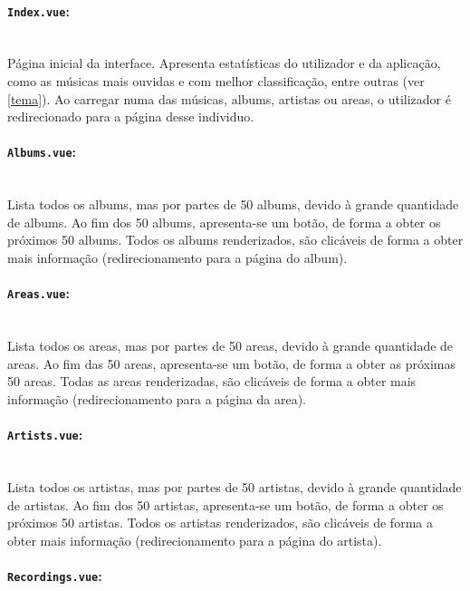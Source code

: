 \documentclass{article}
\begin{document}
\paragraph{\texttt{Index.vue}:}\mbox{}\\

Página inicial da interface. Apresenta estatísticas do utilizador e da aplicação, como as músicas mais ouvidas e com melhor classificação, entre outras (ver \ref{tema}). Ao carregar numa das músicas, albums, artistas ou areas, o utilizador é redirecionado para a página desse individuo.

\paragraph{\texttt{Albums.vue}:}\mbox{}\\

Lista todos os albums, mas por partes de 50 albums, devido à grande quantidade de albums. Ao fim dos 50 albums, apresenta-se um botão, de forma a obter os próximos 50 albums. Todos os albums renderizados, são clicáveis de forma a obter mais informação (redirecionamento para a página do album).

\paragraph{\texttt{Areas.vue}:}\mbox{}\\

Lista todos os areas, mas por partes de 50 areas, devido à grande quantidade de areas. Ao fim das 50 areas, apresenta-se um botão, de forma a obter as próximas 50 areas. Todas as areas renderizadas, são clicáveis de forma a obter mais informação (redirecionamento para a página da area).

\paragraph{\texttt{Artists.vue}:}\mbox{}\\

Lista todos os artistas, mas por partes de 50 artistas, devido à grande quantidade de artistas. Ao fim dos 50 artistas, apresenta-se um botão, de forma a obter os próximos 50 artistas. Todos os artistas renderizados, são clicáveis de forma a obter mais informação (redirecionamento para a página do artista).

\paragraph{\texttt{Recordings.vue}:}\mbox{}\\
\end{document}
